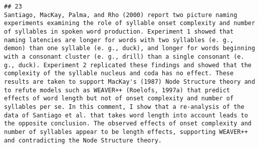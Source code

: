 \documentclass[
  english,
  man]{apa6}
\begin{document}
\begin{verbatim}
## 23                                                                                                                                                                                                                                                                                                                                                                                                                                                                                                                                                                                                                                                                                                                                                                                                                                                                                                                                                                                                                                                                                                                                                                                                                                                                                                                                                                                                                                                                                                                                                                     Santiago, MacKay, Palma, and Rho (2000) report two picture naming experiments examining the role of syllable onset complexity and number of syllables in spoken word production. Experiment 1 showed that naming latencies are longer for words with two syllables (e. g., demon) than one syllable (e. g., duck), and longer for words beginning with a consonant cluster (e. g., drill) than a single consonant (e. g., duck). Experiment 2 replicated these findings and showed that the complexity of the syllable nucleus and coda has no effect. These results are taken to support MacKay's (1987) Node Structure theory and to refute models such as WEAVER++ (Roelofs, 1997a) that predict effects of word length but not of onset complexity and number of syllables per se. In this comment, I show that a re-analysis of the data of Santiago et al. that takes word length into account leads to the opposite conclusion. The observed effects of onset complexity and number of syllables appear to be length effects, supporting WEAVER++ and contradicting the Node Structure theory.

\end{verbatim}
\end{document}
